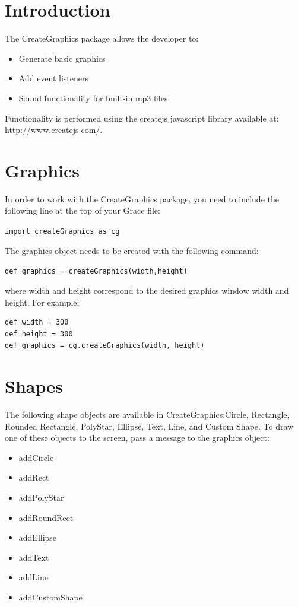 \documentclass{article}
\begin{document}
\section{Introduction}
The CreateGraphics package allows the developer to:

\begin{itemize}
\item Generate basic graphics
\item Add event listeners
\item Sound functionality for built-in mp3 files
\end{itemize}

Functionality is performed using the createjs javascript library available at:\\
\url{http://www.createjs.com/}. 

\section{Graphics}
In order to work with the CreateGraphics package, you need to include the 
following line at the top of your Grace file:

\texttt{import createGraphics as cg}

The graphics object needs to be created with the following command:

\texttt{def graphics = createGraphics(width,height)} 

where width and height correspond to the desired graphics window width
and height. For example:

\begin{lstlisting}
def width = 300
def height = 300
def graphics = cg.createGraphics(width, height)
\end{lstlisting}

\section{Shapes}
The following shape objects are available in CreateGraphics:Circle, Rectangle, Rounded Rectangle, PolyStar, Ellipse, Text, Line, and Custom Shape.
To draw one of these objects to the screen, pass a message to the graphics object:

\begin{itemize}
\item addCircle
\item addRect
\item addPolyStar
\item addRoundRect
\item addEllipse
\item addText
\item addLine
\item addCustomShape
\end{itemize}
\end{document}
